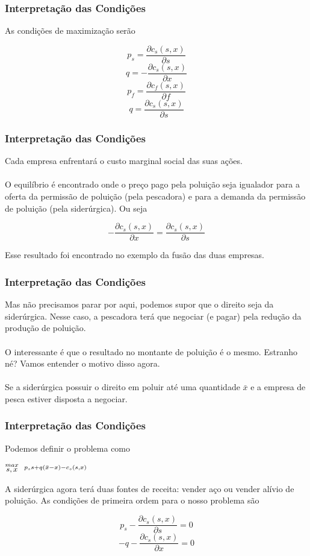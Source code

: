 \documentclass{beamer}[10]
\begin{document}
\begin{frame}
	\frametitle{Interpretação das Condições}

	 As condições de maximização serão 

	$$ p_s = \frac{\partial c_s(s,x)}{\partial s} $$
	$$ q = - \frac{\partial c_s(s,x)}{\partial x} $$
	$$ p_f = \frac{\partial c_f(s,x)}{\partial f} $$
	$$ q = \frac{\partial c_s(s,x)}{\partial s} $$

\end{frame}

\begin{frame}
	\frametitle{Interpretação das Condições}

	Cada empresa enfrentará o custo marginal social das suas ações.
	\\~\\
	O equilíbrio é encontrado onde o preço pago pela poluição seja igualador para a oferta da permissão de poluição (pela pescadora) e para a demanda da permissão de poluição (pela siderúrgica). Ou seja

	$$-\frac{\partial c_s(s,x)}{\partial x} = \frac{\partial c_s(s,x)}{\partial s}$$

	Esse resultado foi encontrado no exemplo da fusão das duas empresas.

\end{frame}

\begin{frame}
	\frametitle{Interpretação das Condições}

	Mas não precisamos parar por aqui, podemos supor que o direito seja da siderúrgica. Nesse caso, a pescadora terá que negociar (e pagar) pela redução da produção de poluição.
	\\~\\
	O interessante é que o resultado no montante de poluição é o mesmo. Estranho né? Vamos entender o motivo disso agora.
	\\~\\
	Se a siderúrgica possuir o direito em poluir até uma quantidade $\bar{x}$ e a empresa de pesca estiver disposta a negociar.

\end{frame}

\begin{frame}
	\frametitle{Interpretação das Condições}

	Podemos definir o problema como

	\begin{center}
		\LARGE $ \stackrel{max}{\text{\small $s,x$}} \ \ %
		\stackrel{p_ss + q(\bar{x} - x) - c_s(s,x)}{\ } $ %
	\end{center}

	A siderúrgica agora terá duas fontes de receita: vender aço ou vender alívio de poluição. As condições de primeira ordem para o nosso problema são

	$$ p_s - \frac{\partial c_s(s,x)}{\partial s} = 0 $$
	$$ -q - \frac{\partial c_s(s,x)}{\partial x} = 0 $$

\end{frame}
\end{document}

